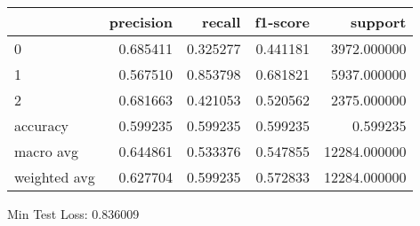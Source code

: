 \begin{tabular}{lrrrr}
\toprule
{} &  precision &    recall &  f1-score &       support \\
\midrule
0            &   0.685411 &  0.325277 &  0.441181 &   3972.000000 \\
1            &   0.567510 &  0.853798 &  0.681821 &   5937.000000 \\
2            &   0.681663 &  0.421053 &  0.520562 &   2375.000000 \\
accuracy     &   0.599235 &  0.599235 &  0.599235 &      0.599235 \\
macro avg    &   0.644861 &  0.533376 &  0.547855 &  12284.000000 \\
weighted avg &   0.627704 &  0.599235 &  0.572833 &  12284.000000 \\
\bottomrule
\end{tabular}

Min Test Loss: 0.836009